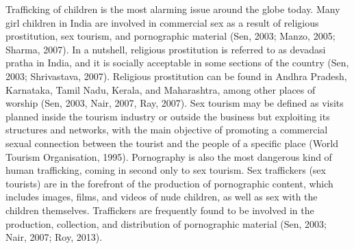 \begin{multicols}{2}
\noi
Trafficking of children is the most alarming issue around the globe today. Many girl
children in India are involved in commercial sex as a result of religious prostitution,
sex tourism, and pornographic material (Sen, 2003; Manzo, 2005; Sharma, 2007). In a
nutshell, religious prostitution is referred to as devadasi pratha in India, and it is socially
acceptable in some sections of the country (Sen, 2003; Shrivastava, 2007). Religious
prostitution can be found in Andhra Pradesh, Karnataka, Tamil Nadu, Kerala, and
Maharashtra, among other places of worship (Sen, 2003, Nair, 2007, Ray, 2007). Sex
tourism may be defined as visits planned inside the tourism industry or outside the
business but exploiting its structures and networks, with the main objective of
promoting a commercial sexual connection between the tourist and the people of a
specific place (World Tourism Organisation, 1995). Pornography is also the most
dangerous kind of human trafficking, coming in second only to sex tourism. Sex
traffickers (sex tourists) are in the forefront of the production of pornographic content,
which includes images, films, and videos of nude children, as well as sex with the
children themselves. Traffickers are frequently found to be involved in the production,
collection, and distribution of pornographic material (Sen, 2003; Nair, 2007; Roy,
2013).


\end{multicols}
